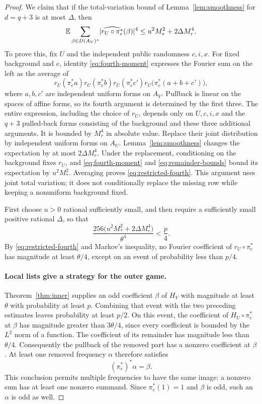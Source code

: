 \begin{proof}
We claim that if the total-variation bound of Lemma~\ref{lem:smoothness} for
$d=q+3$ is at most $\Delta$, then
\begin{equation}\label{eq:restricted-fourth}
 \mathbb E\sum_{\beta\in D(A_V)^*}
       \lvert\widehat{r_U\circ\pi_e^*}(\beta)\rvert^4
 \le u^2M_*^2+2\Delta M_r^4.
\end{equation}
To prove this, fix $U$ and the independent public randomness $c,i,x$.
For fixed background and $e$, identity \eqref{eq:fourth-moment} expresses the
Fourier sum on the left as the average of
\[
 r_U(\pi_e^*a)r_U(\pi_e^*b)r_U(\pi_e^*c')
 r_U\bigl(\pi_e^*(a+b+c')\bigr),
\]
where $a,b,c'$ are independent uniform forms on $A_V$. Pullback is linear
on the spaces of affine forms, so its fourth argument is determined by the
first three. The entire expression, including the choice of $r_U$, depends
only on $U,c,i,x$ and the $q+3$ pulled-back forms consisting of the background
and these three additional arguments. It is bounded by $M_r^4$ in absolute
value. Replace their joint distribution by independent uniform forms on
$A_U$. Lemma~\ref{lem:smoothness} changes the expectation by at most
$2\Delta M_r^4$. Under the replacement, conditioning on the background fixes
$r_U$, and \eqref{eq:fourth-moment} and \eqref{eq:remainder-bounds} bound its
expectation by $u^2M_*^2$. Averaging proves
\eqref{eq:restricted-fourth}. This argument uses joint total variation; it
does not conditionally replace the missing row while keeping a nonuniform
background fixed.

First choose $u>0$ rational sufficiently small, and then require a sufficiently
small positive rational $\Delta$, so that
\begin{equation}\label{eq:remainder-choice}
 \frac{256\bigl(u^2M_*^2+2\Delta M_r^4\bigr)}{\theta^4}<\frac p4.
\end{equation}
By \eqref{eq:restricted-fourth} and Markov's inequality, no Fourier
coefficient of $r_U\circ\pi_e^*$ has magnitude at least $\theta/4$, except
on an event of probability less than $p/4$.

\paragraph{Local lists give a strategy for the outer game.}
Theorem~\ref{thm:inner} supplies an odd coefficient $\beta$ of $H_V$ with
magnitude at least $\theta$ with probability at least $p$. Combining that
event with the two preceding estimates leaves probability at least $p/2$.
On this event, the coefficient of $H_U\circ\pi_e^*$ at $\beta$ has magnitude
greater than $3\theta/4$, since every coefficient is bounded by the $L^2$
norm of a function. The coefficient of its remainder has magnitude less
than $\theta/4$. Consequently the pullback of the removed part has a nonzero
coefficient at $\beta$. At least one removed frequency $\alpha$ therefore
satisfies
\[
 (\pi_e^*)^*\alpha=\beta.
\]
This conclusion permits multiple frequencies to have the same image:
a nonzero sum has at least one nonzero summand. Since $\pi_e^*(1)=1$ and
$\beta$ is odd, such an $\alpha$ is odd as well.


\end{proof}
